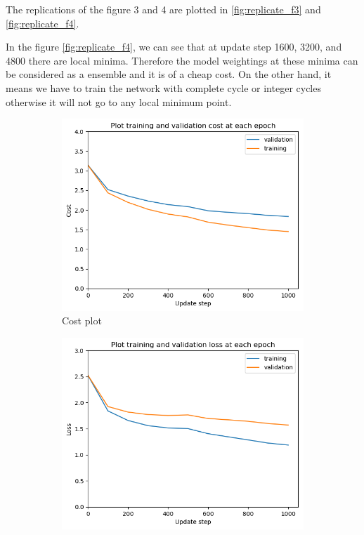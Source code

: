 \documentclass[12pt]{article}
\newenvironment{question}[2][Question]{\begin{trivlist}
\kern10pt
\item[\hskip \labelsep {\bfseries #1}\hskip \labelsep {\bfseries #2.}]}{\end{trivlist}}
\begin{document}
\begin{question}{ii}

The replications of the figure 3 and 4 are plotted in \ref{fig:replicate_f3} and
\ref{fig:replicate_f4}.

In the figure \ref{fig:replicate_f4}, we can see that at update step 1600, 3200,
and 4800 there are local minima. Therefore the model weightings at these minima
can be considered as a ensemble and it is of a cheap cost.
On the other hand, it means we have to
train the network with complete cycle or integer cycles otherwise it will not go to any local
minimum point.

\begin{figure}[!htb]
    \begin{subfigure}[b]{0.32\textwidth}
        \includegraphics[width=\linewidth]{f3_cost_plt.png}
        \caption{Cost plot}
    \end{subfigure}
    \hfill
    \begin{subfigure}[b]{0.32\textwidth}
        \includegraphics[width=\linewidth]{f3_loss_plt.png}

\end{subfigure}
\end{figure}
\end{question}
\end{document}
